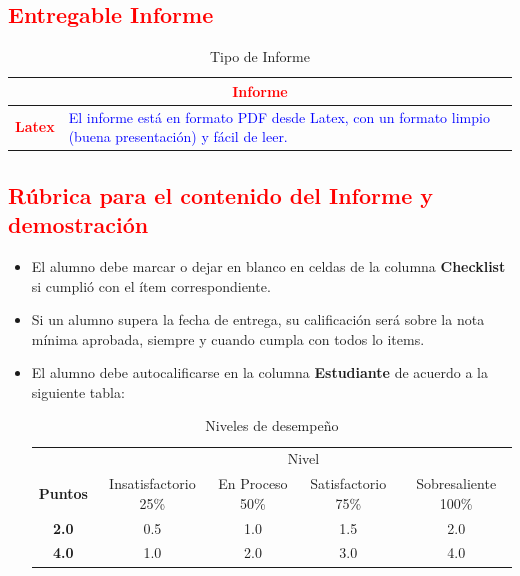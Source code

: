 \documentclass{article}
\begin{document}
	\subsection{\textcolor{red}{Entregable Informe}}
	\begin{table}[H]
		\caption{Tipo de Informe}
		\setlength{\tabcolsep}{0.5em} %
		{\renewcommand{\arraystretch}{1.5}%
		\begin{tabular}{|p{3cm}|p{12cm}|}
			\hline
			\multicolumn{2}{|c|}{\textbf{\textcolor{red}{Informe}}}  \\
			\hline 
			\textbf{\textcolor{red}{Latex}} & \textcolor{blue}{El informe está en formato PDF desde Latex,  con un formato limpio (buena presentación) y fácil de leer.}   \\ 
			\hline 
			
			
		\end{tabular}
	}
	\end{table}
	
	\clearpage
	
	\subsection{\textcolor{red}{Rúbrica para el contenido del Informe y demostración}}
	\begin{itemize}			
		\item El alumno debe marcar o dejar en blanco en celdas de la columna \textbf{Checklist} si cumplió con el ítem correspondiente.
		\item Si un alumno supera la fecha de entrega,  su calificación será sobre la nota mínima aprobada, siempre y cuando cumpla con todos lo items.
		\item El alumno debe autocalificarse en la columna \textbf{Estudiante} de acuerdo a la siguiente tabla:
	
		\begin{table}[ht]
			\caption{Niveles de desempeño}
			\begin{center}
			\begin{tabular}{ccccc}
    			\hline
    			 & \multicolumn{4}{c}{Nivel}\\
    			\cline{1-5}
    			\textbf{Puntos} & Insatisfactorio 25\%& En Proceso 50\% & Satisfactorio 75\% & Sobresaliente 100\%\\
    			\textbf{2.0}&0.5&1.0&1.5&2.0\\
    			\textbf{4.0}&1.0&2.0&3.0&4.0\\
    		\hline
			\end{tabular}
		\end{center}
	\end{table}	
	
	\end{itemize}
	
\end{document}

